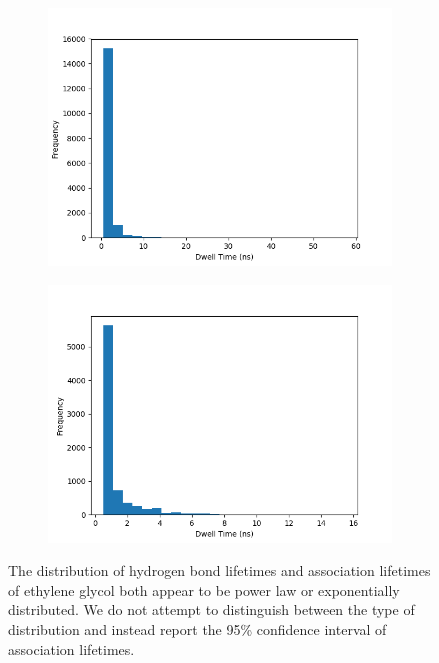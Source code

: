\documentclass{article}
\begin{document}
  \begin{figure}[!htb]
  \centering
  \begin{subfigure}{0.45\textwidth}
  \includegraphics[width=\linewidth]{gcl_hbond_dist.png}
  \caption{}
  \end{subfigure}
  \begin{subfigure}{0.45\textwidth}
  \includegraphics[width=\linewidth]{gcl_coord_dist.png}
  \caption{}
  \end{subfigure}
  \caption{The distribution of hydrogen bond lifetimes and association lifetimes of
  ethylene glycol both appear to be power law or exponentially distributed. We
  do not attempt to distinguish between the type of distribution and instead report
  the 95\% confidence interval of association lifetimes.}\label{fig:lifetime_distributions}
  \end{figure}  
  
\end{document}
